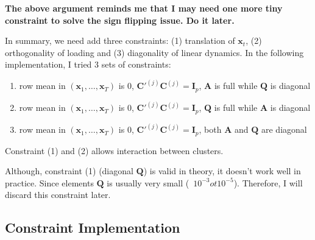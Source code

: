 \documentclass[]{article}
\begin{document}
\textbf{The above argument reminds me that I may need one more tiny constraint to solve the sign flipping issue. Do it later.}

In summary, we need add three constraints: (1) translation of \(\mathbf{x}_{t}\),
(2) orthogonality of loading and (3) diagonality of linear dynamics. In the following implementation, I tried 3 sets of constraints:

\begin{enumerate}
	\def\labelenumi{(\arabic{enumi})}
	\item
	row mean in \((\mathbf{x}_{1},\ldots,\mathbf{x}_{T})\) is 0,
	\(\mathbf{C}'^{(j)}\mathbf{C}^{(j)} = \mathbf{I}_{p}\), \(\mathbf{A}\) is full while \(\mathbf{Q}\) is
	diagonal
	\item
	row mean in \((\mathbf{x}_{1},\ldots,\mathbf{x}_{T})\) is 0,
	\(\mathbf{C}'^{(j)}\mathbf{C}^{(j)} = \mathbf{I}_{p}\), \(\mathbf{Q}\) is full while \(\mathbf{A}\) is
	diagonal
	\item
	row mean in \((\mathbf{x}_{1},\ldots,\mathbf{x}_{T})\) is 0,
	\(\mathbf{C}'^{(j)}\mathbf{C}^{(j)} = \mathbf{I}_{p}\), both \(\mathbf{A}\) and \(\mathbf{Q}\) are diagonal
\end{enumerate}

Constraint (1) and (2) allows interaction between clusters.

Although, constraint (1) (diagonal $\mathbf{Q}$) is valid in theory, it doesn't work well in practice. Since elements $\mathbf{Q}$ is usually very small (~$10^{-3} ot 10^{-5}$).
Therefore, I will discard this constraint later.

\subsection{Constraint Implementation}
\end{document}
